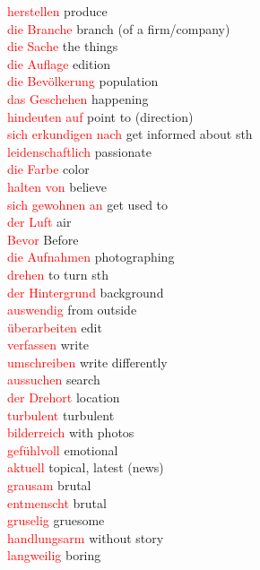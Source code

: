 \documentclass{article}
\begin{document}
\begin{multicols}{2}
	\textcolor{red}{herstellen} produce\\
	\textcolor{red}{die Branche} branch (of a firm/company)\\
	\textcolor{red}{die Sache} the things\\
	\textcolor{red}{die Auflage} edition\\
	\textcolor{red}{die Bevölkerung} population \\
	\textcolor{red}{das Geschehen} happening \\
	\textcolor{red}{hindeuten auf} point to (direction)\\
	\textcolor{red}{sich erkundigen nach} get informed about sth \\
	\textcolor{red}{leidenschaftlich} passionate \\
	\textcolor{red}{die Farbe} color \\ 
	\textcolor{red}{halten von} believe\\
	\textcolor{red}{sich gewohnen an} get used to \\ 
	\textcolor{red}{der Luft} air\\
	\textcolor{red}{Bevor} Before\\
	\textcolor{red}{die Aufnahmen} photographing\\
	\textcolor{red}{drehen} to turn sth \\ 
	\textcolor{red}{der Hintergrund} background\\ 
	\textcolor{red}{auswendig} from outside\\ 
	\textcolor{red}{überarbeiten} edit\\ 
	\textcolor{red}{verfassen} write\\
	\textcolor{red}{umschreiben} write differently\\
	\textcolor{red}{aussuchen} search\\
	\textcolor{red}{der Drehort} location\\ 
	\textcolor{red}{turbulent} turbulent \\
	\textcolor{red}{bilderreich} with photos\\
	\textcolor{red}{gefühlvoll} emotional\\
	\textcolor{red}{aktuell} topical, latest (news) \\
	\textcolor{red}{grausam} brutal\\
	\textcolor{red}{entmenscht} brutal\\
	\textcolor{red}{gruselig} gruesome\\
	\textcolor{red}{handlungsarm} without story\\
	\textcolor{red}{langweilig} boring\\

\end{multicols}
\end{document}
